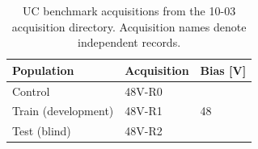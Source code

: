 \begin{table}[H]
\centering
\small
\begin{tabular}{lll}
\toprule
Population & Acquisition & Bias [V] \\
\midrule
Control & 48V-R0 & \multirow{3}{*}{48} \\
Train (development) & 48V-R1 &  \\
Test (blind) & 48V-R2 &  \\
\bottomrule
\end{tabular}
\caption{UC benchmark acquisitions from the 10-03 acquisition directory. Acquisition names denote independent records.}
\label{tab:uc-acquisitions}
\end{table}
